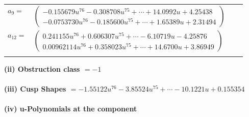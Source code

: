 \documentclass[1p]{elsarticle_modified}
\theoremstyle{definition}
\begin{document}
\begin{tabular}{m{7pt} m{180pt} m{7pt} m{180pt} }
\flushright $a_{9}=$&$\begin{pmatrix}-0.155679 u^{76}-0.308708 u^{75}+\cdots+14.0992 u+4.25438\\-0.0753730 u^{76}-0.185600 u^{75}+\cdots+1.65389 u+2.31494\end{pmatrix}$ \\
\flushright $a_{12}=$&$\begin{pmatrix}0.241155 u^{76}+0.606307 u^{75}+\cdots-6.10719 u-4.25876\\0.00962114 u^{76}+0.358023 u^{75}+\cdots+14.6700 u+3.86949\end{pmatrix}$\\&\end{tabular}
\flushleft \textbf{(ii) Obstruction class $= -1$}\\~\\
\flushleft \textbf{(iii) Cusp Shapes $= -1.55122 u^{76}-3.85524 u^{75}+\cdots-10.1221 u+0.155354$}\\~\\
\newpage\renewcommand{\arraystretch}{1}
\flushleft \textbf{(iv) u-Polynomials at the component}\newline \\
\end{document}
